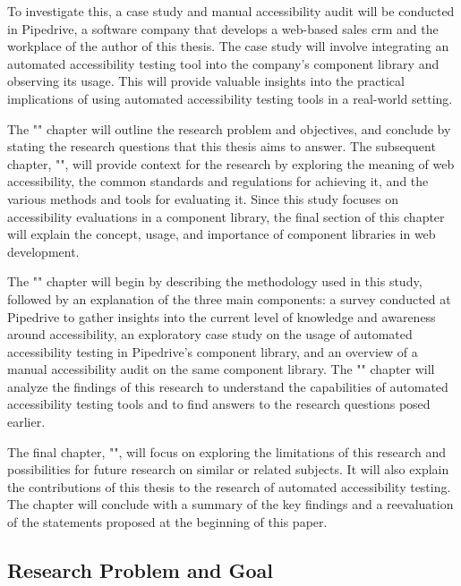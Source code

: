 \documentclass{master_thesis}
\begin{document}
To investigate this, a case study and manual accessibility audit will be conducted in Pipedrive, a software company that develops a web-based sales \ac{crm} and the workplace of the author of this thesis. The case study will involve integrating an automated accessibility testing tool into the company's component library and observing its usage. This will provide valuable insights into the practical implications of using automated accessibility testing tools in a real-world setting.


The "" chapter will outline the research problem and objectives, and conclude by stating the research questions that this thesis aims to answer. The subsequent chapter, "", will provide context for the research by exploring the meaning of web accessibility, the common standards and regulations for achieving it, and the various methods and tools for evaluating it. Since this study focuses on accessibility evaluations in a component library, the final section of this chapter will explain the concept, usage, and importance of component libraries in web development.

The "" chapter will begin by describing the methodology used in this study, followed by an explanation of the three main components: a survey conducted at Pipedrive to gather insights into the current level of knowledge and awareness around accessibility, an exploratory case study on the usage of automated accessibility testing in Pipedrive's component library, and an overview of a manual accessibility audit on the same component library. The "" chapter will analyze the findings of this research to understand the capabilities of automated accessibility testing tools and to find answers to the research questions posed earlier.

The final chapter, "", will focus on exploring the limitations of this research and possibilities for future research on similar or related subjects. It will also explain the contributions of this thesis to the research of automated accessibility testing. The chapter will conclude with a summary of the key findings and a reevaluation of the statements proposed at the beginning of this paper.

\subsection{Research Problem and Goal}
\end{document}
